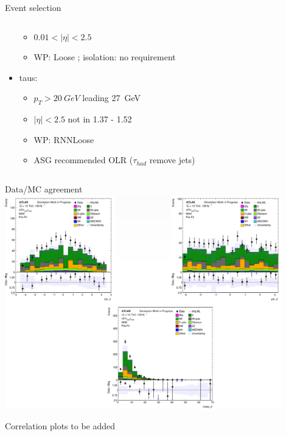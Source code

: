 \documentclass[10pt, UKenglish]{beamer}
\begin{document}
\begin{frame}{Event selection}
\begin{columns}
\begin{column}{0.7\textwidth}
\begin{itemize}
\begin{itemize}
            \item $0.01<|\eta|<2.5$
            \item WP: Loose ; isolation: no requirement
          \end{itemize}
          \item taus:
          \vspace*{-0.02\textwidth}
          \begin{itemize}
            \footnotesize
            \item $p_T>\SI{20}{GeV}$ leading \SI{27}{GeV}
            \item $|\eta|<2.5$ not in 1.37 - 1.52
            \item WP: RNNLoose
            \item ASG recommended OLR ($\tau_{had}$ remove jets)
          \end{itemize}
        \end{itemize}
      \end{column}
    \end{columns}
\end{frame}
%
\begin{frame}{Data/MC agreement}
  \centering \includegraphics[width=0.9\textwidth]{data_mc_agreement}
\end{frame}
%
\begin{frame}{Correlation}
  plots to be added
\end{frame}
%
\end{document}
